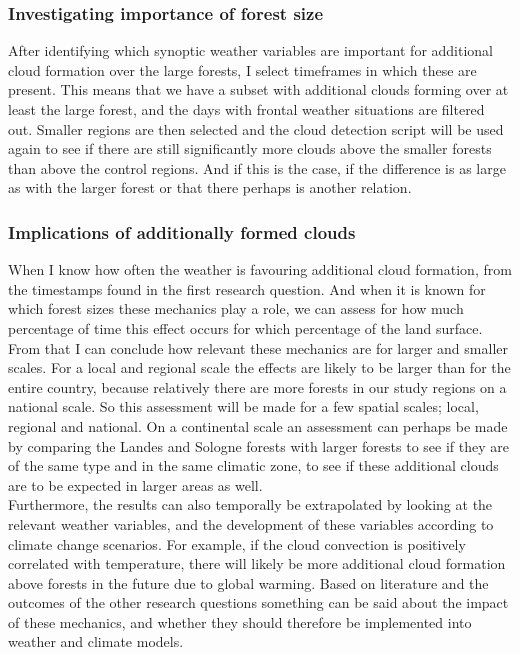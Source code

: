 \documentclass{article}
\begin{document}
\subsubsection{Investigating importance of forest size}
After identifying which synoptic weather variables are important for additional cloud formation over the large forests, I select timeframes in which these are present. This means that we have a subset with additional clouds forming over at least the large forest, and the days with frontal weather situations are filtered out. Smaller regions are then selected and the cloud detection script will be used again to see if there are still significantly more clouds above the smaller forests than above the control regions. And if this is the case, if the difference is as large as with the larger forest or that there perhaps is another relation.

\subsubsection{Implications of additionally formed clouds}
When I know how often the weather is favouring additional cloud formation, from the timestamps found in the first research question. And when it is known for which forest sizes these mechanics play a role, we can assess for how much percentage of time this effect occurs for which percentage of the land surface. From that I can conclude how relevant these mechanics are for larger and smaller scales. For a local and regional scale the effects are likely to be larger than for the entire country, because relatively there are more forests in our study regions on a national scale. So this assessment will be made for a few spatial scales; local, regional and national. On a continental scale an assessment can perhaps be made by comparing the Landes and Sologne forests with larger forests to see if they are of the same type and in the same climatic zone, to see if these additional clouds are to be expected in larger areas as well.\\

Furthermore, the results can also temporally be extrapolated by looking at the relevant weather variables, and the development of these variables according to climate change scenarios. For example, if the cloud convection is positively correlated with temperature, there will likely be more additional cloud formation above forests in the future due to global warming. Based on literature and the outcomes of the other research questions something can be said about the impact of these mechanics, and whether they should therefore be implemented into weather and climate models.\\
\end{document}
